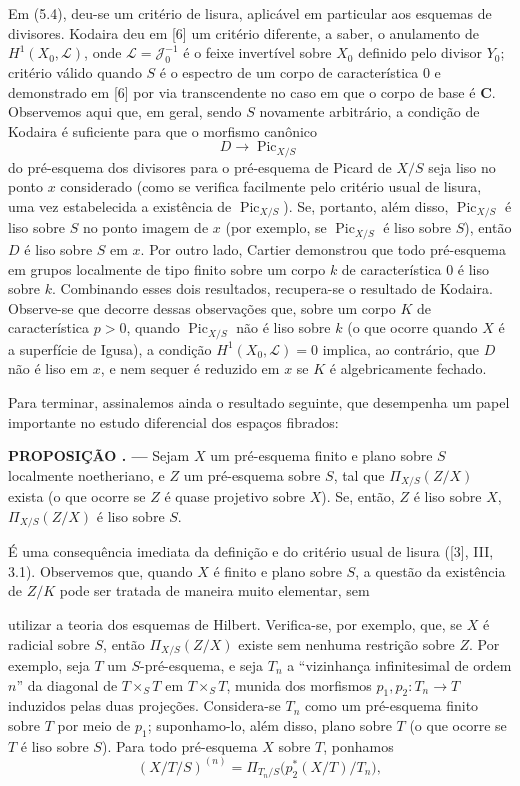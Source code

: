 \documentclass[11pt,twoside,openany]{book}
\numberwithin{equation}{section}
\newcommand{\src}[1]{%
  \phantomsection\hypertarget{src:#1}{}%
  \marginpar{\raggedleft\footnotesize\sffamily #1}%
}
\theoremstyle{plain}
\theoremstyle{definition}
\theoremstyle{remark}
\newcommand{\result}[2]{%
  \par\medskip\noindent\textbf{#1%
  \if\relax\detokenize{#2}\relax\else\space#2\fi. ---}\enspace
}
\newcommand{\FgaUnitKey}{frontmatter}
\renewcommand{\src}[1]{%
  \phantomsection\hypertarget{src:\FgaUnitKey:#1}{}%
  \marginpar{\raggedleft\footnotesize\sffamily #1}%
}
\begin{document}
Em (5.4), deu-se um critério de lisura, aplicável em particular aos esquemas de
divisores. Kodaira deu em [6] um critério diferente, a saber, o anulamento de
$H^1(X_0,\mathcal L)$, onde $\mathcal L=\mathcal J_0^{-1}$ é o feixe
invertível sobre $X_0$ definido pelo divisor $Y_0$; critério válido quando $S$
é o espectro de um corpo de característica 0 e demonstrado em [6] por via
transcendente no caso em que o corpo de base é $\mathbf C$. Observemos aqui
que, em geral, sendo $S$ novamente arbitrário, a condição de Kodaira é
suficiente para que o morfismo canônico
\[
D\longrightarrow\operatorname{Pic}_{X/S}
\]
do pré-esquema dos divisores para o pré-esquema de Picard de $X/S$ seja liso
no ponto $x$ considerado (como se verifica facilmente pelo critério usual de
lisura, uma vez estabelecida a existência de $\operatorname{Pic}_{X/S}$). Se,
portanto, além disso, $\operatorname{Pic}_{X/S}$ é liso sobre $S$ no ponto
imagem de $x$ (por exemplo, se $\operatorname{Pic}_{X/S}$ é liso sobre $S$),
então $D$ é liso sobre $S$ em $x$. Por outro lado, Cartier demonstrou que todo
pré-esquema em grupos localmente de tipo finito sobre um corpo $k$ de
característica 0 é liso sobre $k$. Combinando esses dois resultados, recupera-se
o resultado de Kodaira. Observe-se que decorre dessas observações que, sobre um
corpo $K$ de característica $p>0$, quando $\operatorname{Pic}_{X/S}$ não é
liso sobre $k$ (o que ocorre quando $X$ é a superfície de Igusa), a condição
$H^1(X_0,\mathcal L)=0$ implica, ao contrário, que $D$ não é liso em $x$, e
nem sequer é reduzido em $x$ se $K$ é algebricamente fechado.

Para terminar, assinalemos ainda o resultado seguinte, que desempenha um papel
importante no estudo diferencial dos espaços fibrados:

\result{PROPOSIÇÃO}{5.7} Sejam $X$ um pré-esquema finito e plano sobre $S$
localmente noetheriano, e $Z$ um pré-esquema sobre $S$, tal que
$\Pi_{X/S}(Z/X)$ exista (o que ocorre se $Z$ é quase projetivo sobre $X$). Se,
então, $Z$ é liso sobre $X$, $\Pi_{X/S}(Z/X)$ é liso sobre $S$.

É uma consequência imediata da definição e do critério usual de lisura ([3],
III, 3.1). Observemos que, quando $X$ é finito e plano sobre $S$, a questão da
existência de $Z/K$ pode ser tratada de maneira muito elementar, sem
\src{273}
utilizar a teoria dos esquemas de Hilbert. Verifica-se, por exemplo, que, se
$X$ é radicial sobre $S$, então $\Pi_{X/S}(Z/X)$ existe sem nenhuma restrição
sobre $Z$. Por exemplo, seja $T$ um $S$-pré-esquema, e seja $T_n$ a
``vizinhança infinitesimal de ordem $n$'' da diagonal de $T\times_ST$ em
$T\times_ST$, munida dos morfismos $p_1,p_2:T_n\longrightarrow T$ induzidos
pelas duas projeções. Considera-se $T_n$ como um pré-esquema finito sobre $T$
por meio de $p_1$; suponhamo-lo, além disso, plano sobre $T$ (o que ocorre se
$T$ é liso sobre $S$). Para todo pré-esquema $X$ sobre $T$, ponhamos
\[
(X/T/S)^{(n)}=
\Pi_{T_n/S}\bigl(p_2^*(X/T)/T_n\bigr),
\]
\end{document}
